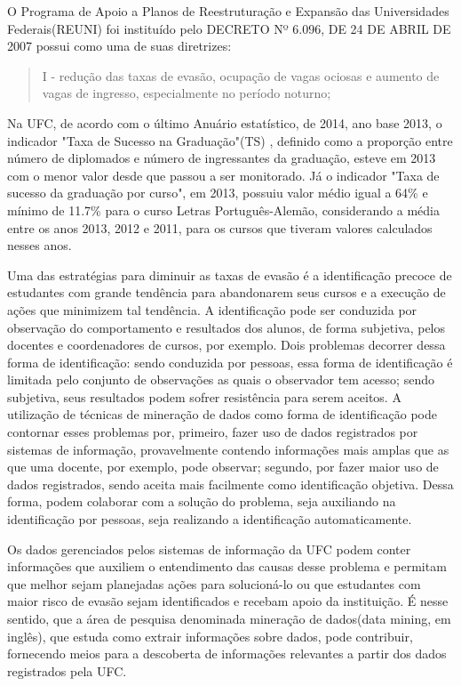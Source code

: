 O Programa de Apoio a Planos de Reestruturação e Expansão das Universidades Federais(REUNI) foi instituído pelo DECRETO Nº 6.096, DE 24 DE ABRIL DE 2007  possui como uma de suas diretrizes:
\begin{quote}
I - redução das taxas de evasão, ocupação de vagas ociosas e aumento de vagas de ingresso, especialmente no período noturno;
\end{quote}

Na UFC, de acordo com o último Anuário estatístico, de 2014, ano base 2013, o indicador "Taxa de Sucesso na Graduação"(TS) , definido como a proporção entre número de diplomados e número de ingressantes da graduação, esteve em 2013 com o menor valor desde que passou a ser monitorado. Já o indicador "Taxa de sucesso da graduação por curso", em 2013, possuiu valor médio igual a 64\% e mínimo de 11.7\% para o curso Letras Português-Alemão, considerando a média entre os anos 2013, 2012 e 2011, para os cursos que tiveram valores calculados nesses anos.

Uma das estratégias para diminuir as taxas de evasão é a identificação precoce de estudantes com grande tendência para abandonarem seus cursos e a execução de ações que minimizem tal tendência. A identificação pode ser conduzida por observação do comportamento e resultados dos alunos, de forma subjetiva, pelos docentes e coordenadores de cursos, por exemplo. Dois problemas decorrer dessa forma de identificação: sendo conduzida por pessoas, essa forma de identificação é limitada pelo conjunto de observações as quais o observador tem acesso; sendo subjetiva, seus resultados podem sofrer resistência para serem aceitos. A utilização de técnicas de mineração de dados como forma de identificação pode contornar esses problemas por, primeiro, fazer uso de dados registrados por sistemas de informação, provavelmente contendo informações mais amplas que as que uma docente, por exemplo, pode observar; segundo, por fazer maior uso de dados registrados, sendo aceita mais facilmente como identificação objetiva. Dessa forma, podem colaborar com a solução do problema, seja auxiliando na identificação por pessoas, seja realizando a identificação automaticamente.

Os dados gerenciados pelos sistemas de informação da UFC podem conter informações que auxiliem o entendimento das causas desse problema e permitam que melhor sejam planejadas ações para solucioná-lo ou que estudantes com maior risco de evasão sejam identificados e recebam apoio da instituição. É nesse sentido, que a área de pesquisa denominada mineração de dados(data mining, em inglês), que estuda como extrair informações sobre dados, pode contribuir, fornecendo meios para a descoberta de informações relevantes a partir dos dados registrados pela UFC.

